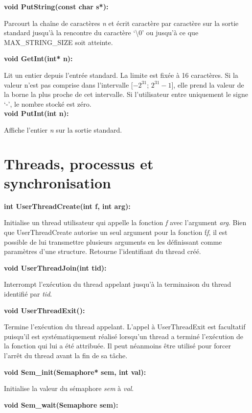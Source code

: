 \documentclass[12pt]{report}
\begin{document}
\bigskip
\textbf{void PutString(const char s*):}

Parcourt la chaîne de caractères \textit{n} et écrit caractère par caractère sur la
sortie standard jusqu'à la rencontre du caractère `\textbackslash 0' ou jusqu'à
ce que MAX\_STRING\_SIZE soit atteinte.


\bigskip
\textbf{void GetInt(int* n):}

Lit un entier depuis l'entrée standard. La limite est fixée à 16 caractères. Si la valeur n'est pas comprise dans l'intervalle [$-2^{31}$;
$2^{31}-1$],  elle prend la valeur de la borne la plus proche de cet intervalle. Si l'utilisateur entre uniquement le signe `-', le nombre stocké est zéro.\\


\textbf{void PutInt(int n):}

Affiche l'entier \textit{n} sur la sortie standard.\\
\bigskip

\section{Threads, processus et synchronisation}
\bigskip

\textbf{int UserThreadCreate(int f, int arg):}

Initialise un thread utilisateur qui appelle la fonction \textit{f} avec l'argument \textit{arg}. Bien que UserThreadCreate autorise un seul argument pour la fonction f\textit{f}, il est possible de lui transmettre plusieurs arguments en les définissant comme paramètres d'une structure.
Retourne l’identifiant du thread créé.
\bigskip

\textbf{void UserThreadJoin(int tid):}

Interrompt l'exécution du thread appelant jusqu'à la terminaison du thread identifié par \textit{tid}.
\bigskip


\textbf{void UserThreadExit():}

Termine l'exécution du thread appelant. L'appel à UserThreadExit est facultatif puisqu'il est systématiquement réalisé lorsqu'un thread a terminé l'exécution de la fonction qui lui a été attribuée. Il peut néanmoins être utilisé pour forcer l'arrêt du thread avant la fin de sa tâche.
\bigskip


\textbf{void Sem\_init(Semaphore* sem, int val):}

Initialise la valeur du sémaphore \textit{sem} à \textit{val}.
\bigskip	


\textbf{void Sem\_wait(Semaphore sem):}
\end{document}
